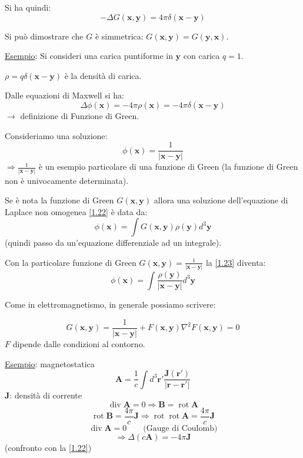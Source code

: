 \documentclass[a4paper,11pt]{report}
\newcommand{\vect}[1]{\boldsymbol{#1}}
\newcommand{\x}{\boldsymbol{x}}
\newcommand{\y}{\boldsymbol{y}}
\begin{document}
Si ha quindi:
\begin{equation}
-\Delta G(\x,\y)=4\pi\delta(\x-\y)
\end{equation}

Si pu\`o dimostrare che $G$ \`e simmetrica: $G(\x,\y)=G(\y,\x)$.

\medskip

\underline{Esempio}: Si consideri una carica puntiforme in $\y$ con carica $q=1$. 

$\rho=q\delta(\x-\y)$ è la densità di carica. 

Dalle equazioni di Maxwell si ha:
\begin{equation}
\Delta \phi(\x)=-4\pi\rho(\x)=-4\pi\delta(\x-\y)
\label{1.22}
\end{equation}
$\rightarrow$ definizione di Funzione di Green.

Consideriamo una soluzione:
\[\phi(\x)=\frac{1}{|\x-\y|}
\]
$\Rightarrow \frac{1}{|\x-\y|}$ \`e un esempio particolare di una funzione di Green (la funzione di Green non \`e univocamente determinata).

Se \`e nota la funzione di Green $G(\x, \y)$ allora una soluzione dell'equazione di Laplace non omogenea \eqref{1.22} \`e data da:
\begin{equation}
\phi(\x)=\int G(\x,\y)\rho(\y)d^3\y
\label{1.23}
\end{equation}
(quindi passo da un'equazione differenziale ad un integrale).

Con la particolare funzione di Green $G(\x, \y)=\frac{1}{|\x-\y|}$ la \eqref{1.23} diventa:
\[
\phi(\x)=\int\frac{\rho(\y)}{|\x-\y|} d^3\y
\]

Come in elettromagnetismo, in generale possiamo scrivere:

\begin{subequations}
\begin{equation}
G(\x,\y)=\frac{1}{|\x-\y|}+F(\x,\y)
\end{equation}
\begin{equation}
\nabla^2F(\x,\y)=0
\end{equation}
\end{subequations}
$F$ dipende dalle condizioni al contorno.

\medskip

\underline{Esempio}: magnetostatica
\[
\vect{A}=\frac{1}{c}\int d^3 \vect{r}' \frac{\vect{J}(\vect{r}')}{|\vect{r}-\vect{r}'|}
\]
$\vect{J}$: densit\`a di corrente
\[
\operatorname{div} \vect{A}=0 \Rightarrow \vect{B}=\operatorname{rot} \vect{A}
\]
\[
\operatorname{rot} \vect{B} = \frac{4 \pi}{c} \vect{J} \Rightarrow \operatorname{rot} \operatorname{rot} \vect{A} = \frac{4 \pi}{c} \vect{J}
\]
\[
\operatorname{div} \vect{A}=0 \qquad\text{(Gauge di Coulomb)}
\]
\[
\Rightarrow \Delta (c\vect{A})=-4\pi \vect{J}
\]
(confronto con la \eqref{1.22})
\end{document}
